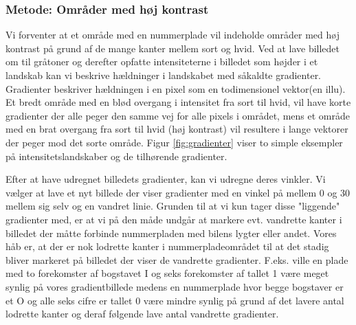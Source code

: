 \subsubsection{Metode: Områder med høj kontrast}
Vi forventer at et område med en nummerplade vil indeholde områder med høj kontrast på grund af de mange kanter mellem sort og hvid. Ved at lave billedet om til gråtoner og derefter opfatte intensiteterne i billedet som højder i et landskab kan vi beskrive hældninger i landskabet med såkaldte gradienter. Gradienter beskriver hældningen i en pixel som en todimensionel vektor(en illu). Et bredt område med en blød overgang i intensitet fra sort til hvid, vil have korte gradienter der alle peger den samme vej for alle pixels i området, mens et område med en brat overgang fra sort til hvid (høj kontrast) vil resultere i lange vektorer der peger mod det sorte område. Figur \vref{fig:gradienter} viser to simple eksempler på intensitetslandskaber og de tilhørende gradienter.

Efter at have udregnet billedets gradienter, kan vi udregne deres vinkler. Vi vælger at lave et nyt billede der viser gradienter med en vinkel på mellem 0 og 30 mellem sig selv og en vandret linie. Grunden til at vi kun tager disse "liggende" gradienter med, er at vi på den måde undgår at markere evt. vandrette kanter i billedet der måtte forbinde nummerpladen med bilens lygter eller andet. Vores håb er, at der er nok lodrette kanter i nummerpladeområdet til at det stadig bliver markeret på billedet der viser de vandrette gradienter. F.eks. ville en plade med to forekomster af bogstavet I og seks forekomster af tallet 1 være meget synlig på vores gradientbillede medens en nummerplade hvor begge bogstaver er et O og alle seks cifre er tallet 0 være mindre synlig på grund af det lavere antal lodrette kanter og deraf følgende lave antal vandrette gradienter. 



